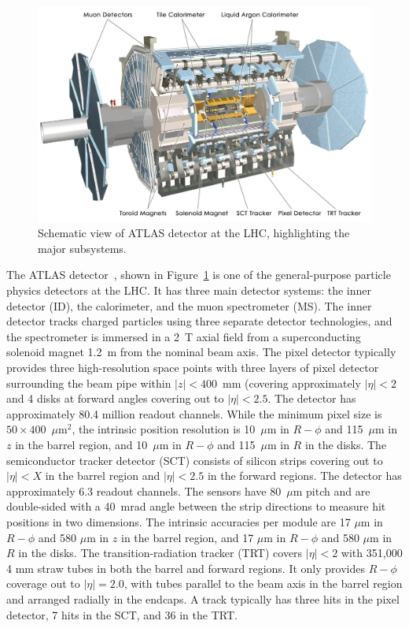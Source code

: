 \begin{figure}[!t]
\begin{center}
\includegraphics[height=0.49\textwidth]{introduction_figs/0803012_05-A4-at-144-dpi.jpg}
\caption[]{Schematic view of ATLAS detector at the LHC, highlighting the major subsystems.}
\label{fig:pas:intro:atlas}
\end{center}
\end{figure}

The ATLAS detector~\cite{Aad:2008zzm}, shown in Figure~\ref{fig:pas:intro:atlas} is one of the general-purpose particle physics
detectors at the LHC.
It has three main detector systems: the inner detector (ID), the calorimeter,
and the muon spectrometer (MS).
%
The inner detector tracks charged particles using three separate detector
technologies, and the spectrometer is immersed in a 2~T axial field from a
superconducting solenoid magnet 1.2~m from the nominal beam axis.
The pixel detector typically provides three high-resolution space points
with three layers of pixel detector surrounding the beam pipe within
$|z|<400$~mm (covering approximately $|\eta|<2$ and 4 disks at forward
angles covering out to $|\eta|<2.5$.
The detector has approximately 80.4 million readout channels.
While the minimum pixel size is $50 \times 400$~$\mu$m$^2$, the intrinsic
position resolution is 10~$\mu\mathrm{m}$ in $R-\phi$ and 115~$\mu\mathrm{m}$ in $z$
in the barrel region, and 10~$\mu\mathrm{m}$ in $R-\phi$ and 115~$\mu\mathrm{m}$ in $R$
in the disks.
The semiconductor tracker detector (SCT) consists of silicon strips covering out to
$|\eta|<X$ in the barrel region and $|\eta|<2.5$ in the forward regions.
The detector has approximately 6.3 readout channels.
The sensors have 80~$\mu$m pitch and are
double-sided with a 40~mrad angle between the strip
directions to measure hit positions in two dimensions.
The intrinsic accuracies per module are
17 $\mu\mathrm{m}$ in $R-\phi$ and 580  $\mu\mathrm{m}$ in $z$
in the barrel region, and 17 $\mu\mathrm{m}$ in $R-\phi$ and 580  $\mu\mathrm{m}$ in $R$
in the disks.
The transition-radiation tracker (TRT) covers $|\eta|<2$ with 351,000 4 mm straw tubes in
both the barrel and forward regions.
It only provides $R-\phi$ coverage out to $|\eta|=2.0$, with tubes parallel to the beam
axis in the barrel region and arranged radially in the endcaps.
A track typically has three hits in the pixel detector, 7 hits in the SCT, and 36 in the
TRT.

